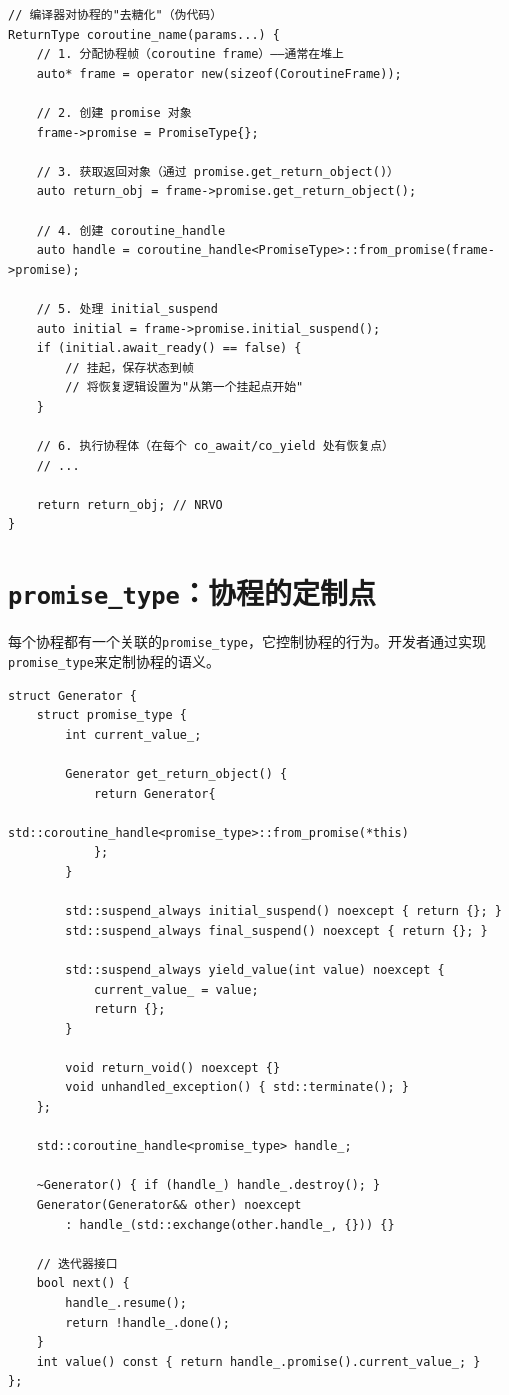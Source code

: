 \documentclass[12pt,a4paper,fontset=fandol]{ctexbook}
\begin{document}
\begin{lstlisting}
// 编译器对协程的"去糖化"（伪代码）
ReturnType coroutine_name(params...) {
    // 1. 分配协程帧（coroutine frame）——通常在堆上
    auto* frame = operator new(sizeof(CoroutineFrame));

    // 2. 创建 promise 对象
    frame->promise = PromiseType{};

    // 3. 获取返回对象（通过 promise.get_return_object()）
    auto return_obj = frame->promise.get_return_object();

    // 4. 创建 coroutine_handle
    auto handle = coroutine_handle<PromiseType>::from_promise(frame->promise);

    // 5. 处理 initial_suspend
    auto initial = frame->promise.initial_suspend();
    if (initial.await_ready() == false) {
        // 挂起，保存状态到帧
        // 将恢复逻辑设置为"从第一个挂起点开始"
    }

    // 6. 执行协程体（在每个 co_await/co_yield 处有恢复点）
    // ...

    return return_obj; // NRVO
}
\end{lstlisting}

\section{\texttt{promise\_type}：协程的定制点}

每个协程都有一个关联的\texttt{promise\_type}，它控制协程的行为。开发者通过实现\texttt{promise\_type}来定制协程的语义。

\begin{lstlisting}
struct Generator {
    struct promise_type {
        int current_value_;

        Generator get_return_object() {
            return Generator{
                std::coroutine_handle<promise_type>::from_promise(*this)
            };
        }

        std::suspend_always initial_suspend() noexcept { return {}; }
        std::suspend_always final_suspend() noexcept { return {}; }

        std::suspend_always yield_value(int value) noexcept {
            current_value_ = value;
            return {};
        }

        void return_void() noexcept {}
        void unhandled_exception() { std::terminate(); }
    };

    std::coroutine_handle<promise_type> handle_;

    ~Generator() { if (handle_) handle_.destroy(); }
    Generator(Generator&& other) noexcept
        : handle_(std::exchange(other.handle_, {})) {}

    // 迭代器接口
    bool next() {
        handle_.resume();
        return !handle_.done();
    }
    int value() const { return handle_.promise().current_value_; }
};
\end{lstlisting}
\end{document}

